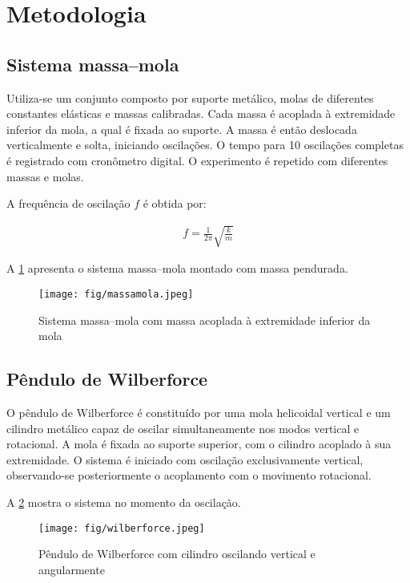 \section{Metodologia}

\subsection{Sistema massa–mola}

Utiliza-se um conjunto composto por suporte metálico, molas de diferentes constantes elásticas e massas calibradas. Cada massa é acoplada à extremidade inferior da mola, a qual é fixada ao suporte. A massa é então deslocada verticalmente e solta, iniciando oscilações. O tempo para 10 oscilações completas é registrado com cronômetro digital. O experimento é repetido com diferentes massas e molas.

A frequência de oscilação \(f\) é obtida por:

\begin{align*}
    f = \frac{1}{2\pi} \sqrt{\frac{k}{m}}
\end{align*}

A \cref{fig:massamola} apresenta o sistema massa–mola montado com massa pendurada.

\begin{figure}[H]
    \centering
    \texttt{[image: fig/massamola.jpeg]}
    \caption{Sistema massa–mola com massa acoplada à extremidade inferior da mola}
    \label{fig:massamola}
\end{figure}

\subsection{Pêndulo de Wilberforce}

O pêndulo de Wilberforce é constituído por uma mola helicoidal vertical e um cilindro metálico capaz de oscilar simultaneamente nos modos vertical e rotacional. A mola é fixada ao suporte superior, com o cilindro acoplado à sua extremidade. O sistema é iniciado com oscilação exclusivamente vertical, observando-se posteriormente o acoplamento com o movimento rotacional.

A \cref{fig:wilberforce} mostra o sistema no momento da oscilação.

\begin{figure}[H]
    \centering
    \texttt{[image: fig/wilberforce.jpeg]}
    \caption{Pêndulo de Wilberforce com cilindro oscilando vertical e angularmente}
    \label{fig:wilberforce}
\end{figure}

